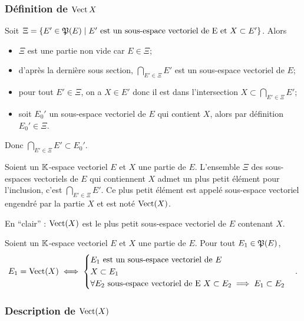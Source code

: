 \subsubsection{Définition de \(\operatorname{Vect}{X}\)}

Soit \(\Xi=\left\{E' \in \mathfrak{P}(E)\mathrel{}\middle|\mathrel{}E' \text{~est un sous-espace vectoriel de E et } X \subset E'\right\}\). Alors
\begin{itemize}
\item \(\Xi\) est une partie non vide car \(E \in \Xi\);
\item d'après la dernière sous section, \(\bigcap_{E' \in \Xi} E'\) est un sous-espace vectoriel de \(E\);
\item pour tout \(E' \in \Xi\), on a \(X \in E'\) donc il est dans l'intersection \(X \subset \bigcap_{E' \in \Xi} E'\);
\item soit \(E_0'\) un sous-espace vectoriel de \(E\) qui contient \(X\), alors par définition \(E_0' \in \Xi\).
\end{itemize}

Donc \(\bigcap_{E' \in \Xi} E' \subset E_0'\).

\begin{defdef}
  Soient un \(\mathbb{K}\)-espace vectoriel \(E\) et \(X\) une partie de \(E\). L'ensemble \(\Xi\) des sous-espaces vectoriels de \(E\) qui contiennent \(X\) admet un plus petit élément pour l'inclusion, c'est \(\bigcap_{E' \in \Xi} E'\). Ce plus petit élément est appelé sous-espace vectoriel engendré par la partie \(X\) et est noté \(\operatorname{Vect}(X)\).

  En ``clair'' : \(\operatorname{Vect}(X)\) est le plus petit sous-espace vectoriel de \(E\) contenant \(X\).
\end{defdef}

\begin{prop}
  Soient un \(\mathbb{K}\)-espace vectoriel \(E\) et \(X\) une partie de \(E\). Pour tout \(E_1 \in \mathfrak{P}(E)\),
  \begin{equation}
    E_1 = \operatorname{Vect}(X) \iff
    \begin{cases}
      E_1 \text{~est un sous-espace vectoriel de } E \\
      X \subset E_1 \\
      \forall E_2 \text{~sous-espace vectoriel de E } X \subset E_2 \implies E_1 \subset E_2
    \end{cases}.
  \end{equation}
\end{prop}

\subsubsection{Description de \(\operatorname{Vect}(X)\)}

